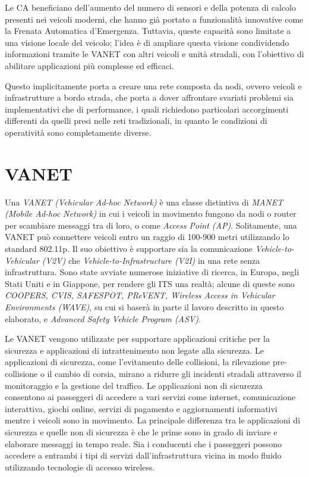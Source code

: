 Le CA beneficiano dell'aumento del numero di sensori e della potenza di calcolo presenti nei veicoli moderni, che hanno già portato a funzionalità innovative come la Frenata Automatica d'Emergenza. Tuttavia, queste capacità sono limitate a una visione locale del veicolo; l'idea è di ampliare questa visione condividendo informazioni tramite le VANET con altri veicoli e unità stradali, con l'obiettivo di abilitare applicazioni più complesse ed efficaci. 

Questo implicitamente porta a creare una rete composta da nodi, ovvero veicoli e infrastrutture a bordo strada, che porta a dover affrontare svariati problemi sia implementativi che di performance, i quali richiedono particolari accorgimenti differenti da quelli presi nelle reti tradizionali, in quanto le condizioni di operatività sono completamente diverse.

\section{VANET}
Una \textit{VANET (Vehicular Ad-hoc Network)} è una classe distintiva di \textit{MANET (Mobile Ad-hoc Network)} in cui i veicoli in movimento fungono da nodi o router per scambiare messaggi tra di loro, o come \textit{Access Point (AP)}. Solitamente, una VANET può connettere veicoli entro un raggio di 100-900 metri utilizzando lo standard 802.11p. Il suo obiettivo è supportare sia la comunicazione \textit{Vehicle-to-Vehicular (V2V)} che \textit{Vehicle-to-Infrastructure (V2I)} in una rete senza infrastruttura. Sono state avviate numerose iniziative di ricerca, in Europa, negli Stati Uniti e in Giappone, per rendere gli ITS una realtà; alcune di queste sono \textit{COOPERS, CVIS, SAFESPOT, PReVENT, Wireless Access in Vehicular Environments (WAVE)}, su cui si baserà in parte il lavoro descritto in questo elaborato, e \textit{Advanced Safety Vehicle Program (ASV)}.

Le VANET vengono utilizzate per supportare applicazioni critiche per la sicurezza e applicazioni di intrattenimento non legate alla sicurezza. Le applicazioni di sicurezza, come l'evitamento delle collisioni, la rilevazione pre-collisione o il cambio di corsia, mirano a ridurre gli incidenti stradali attraverso il monitoraggio e la gestione del traffico. Le applicazioni non di sicurezza consentono ai passeggeri di accedere a vari servizi come internet, comunicazione interattiva, giochi online, servizi di pagamento e aggiornamenti informativi mentre i veicoli sono in movimento. La principale differenza tra le applicazioni di sicurezza e quelle non di sicurezza è che le prime sono in grado di inviare e elaborare messaggi in tempo reale. Sia i conducenti che i passeggeri possono accedere a entrambi i tipi di servizi dall'infrastruttura vicina in modo fluido utilizzando tecnologie di accesso wireless.

